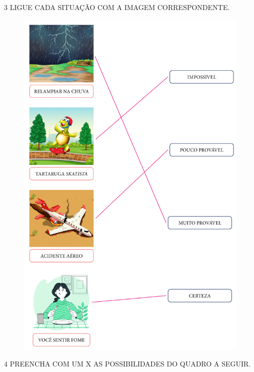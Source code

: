 \pagebreak

\num{3} LIGUE CADA SITUAÇÃO COM A IMAGEM CORRESPONDENTE.


\begin{figure}[htpb!]
\includegraphics[width=.9\textwidth]{../ilustracoes/MAT1/SAEB_1ANO_MAT_FIGURA86.png}
\end{figure}

\pagebreak
\num{4} PREENCHA COM UM X AS POSSIBILIDADES DO QUADRO A SEGUIR.

